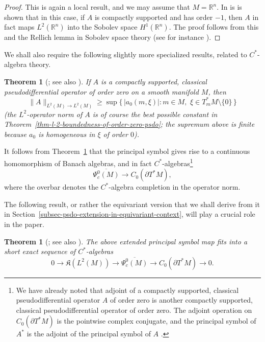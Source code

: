 \documentclass[leqno,11pt]{amsart}
\numberwithin{equation}{subsection}
\theoremstyle{plain}
\newtheorem{theorem}[equation]{Theorem}
\theoremstyle{definition}
\theoremstyle{remark}
\newcommand{\R}{\mathbb{R}}
\begin{document}
\begin{proof} 
This is again a local result, and we may assume that $M=\R^n$.  In \cite[Thm.\ 18.1.1]{HormanderVolIII} is is shown that in this case, if $A$ is compactly supported and has order $-1$, then $A$ in fact maps $L^2 (\R^n)$ into the Sobolev space $H^1 (\R^n)$.
The proof follows from this and the Rellich lemma in Sobolev space theory (see for instance \cite[Thm.\ 5.2.8]{Zimmer90}). 
\end{proof} 

We shall also require the following slightly more specialized results, related to $C^*$-algebra theory. 

\begin{theorem}[{\cite[Lem.\
 7.2]{Seeley65}}; see also {\cite[Thm.\ 5]{KohnNirenberg65}}] 
\label{thm-symbol-map-is-continuous}
If $A$ is a compactly supported,  classical pseudodifferential operator of order zero on a smooth manifold $M$, then 
\[
\| A\|_{L^2(M)\to L^2 (M)} \ge \sup \bigl \{\, |a_0(m,\xi)| : m\in M,\,\, \xi\in T^*_mM \setminus \{ 0\}\,\bigr \}
\]
\textup{(}the $L^2$-operator norm of $A$ is of course the best possible constant in Theorem~\textup{\ref{thm-l-2-boundedness-of-order-zero-psdo}}; the supremum above is finite because $a_0$ is homogeneous in $\xi$ of order $0$\textup{)}.    
\end{theorem}

It follows from Theorem~\ref{thm-symbol-map-is-continuous} that the principal symbol gives rise to a continuous homomorphism of Banach algebras, and in fact $C^*$-algebras\footnote{We have already noted that adjoint of a compactly supported, classical pseudodifferential operator $A$ of order zero is another compactly supported, classical pseudodifferential operator of order zero. The adjoint operation on $C_0(\partial T^*M)$ is the pointwise complex conjugate, and the principal symbol of $A^*$ is the adjoint of  the principal symbol of $A$ \cite[(18.1.11)]{HormanderVolIII}.}
\[
\overline {\Psi^0_c(M)} \longrightarrow C_0(\partial T^*M),
\]
where the overbar denotes the $C^*$-algebra completion in the operator norm.

The following result, or rather the equivariant version   that we shall derive from it in Section~\ref{subsec-psdo-extension-in-equivariant-context}, will play a crucial role in the paper.

\begin{theorem}[{\cite[Thm.\ 14.1]{Seeley65}};  see also {\cite[Cor.\ 6.1]{KohnNirenberg65}}]
The above extended principal symbol map fits into a short exact sequence of $C^*$-algebras
\[
0 \longrightarrow \mathfrak{K}(L^2 (M)) \longrightarrow \overline{\Psi^0_c(M)} \longrightarrow 
C_0(\partial T^*M)
\longrightarrow 0 .
\]
\end{theorem} 
\end{document}
